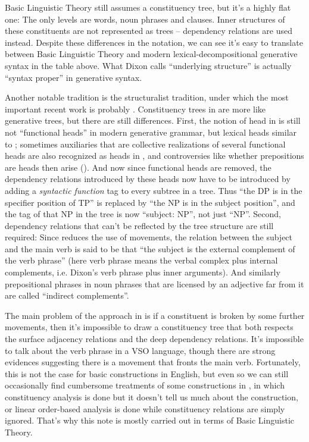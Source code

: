 \documentclass[UTF8, a4paper, oneside, scheme=plain]{ctexrep}
\begin{document}
Basic Linguistic Theory still assumes a constituency tree,
but it's a highly flat one:
The only levels are words, noun phrases and clauses.
Inner structures of these constituents are not represented as trees -- 
dependency relations are used instead.
Despite these differences in the notation, 
we can see it's easy to translate between Basic Linguistic Theory 
and modern lexical-decompositional generative syntax
in the table above.
What Dixon calls ``underlying structure'' is actually ``syntax proper'' in generative syntax.

Another notable tradition is the structuralist tradition,
under which the most important recent work is probably \citet{cgel}.
Constituency trees in \citet{cgel} are more like generative trees,
but there are still differences.
First, the notion of head in \citet{cgel} is still not ``functional heads'' 
in modern generative grammar, but lexical heads similar to \citet{dixon2009basic1};
sometimes auxiliaries that are collective realizations of several functional heads 
are also recognized as heads in \citet{cgel}, 
and controversies like whether prepositions are heads then arise
().
And now since functional heads are removed,
the dependency relations introduced by these heads
now have to be introduced by adding a \emph{syntactic function} tag 
to every subtree in a tree.
Thus ``the DP is in the specifier position of TP''
is replaced by ``the NP is in the subject position'',
and the tag of that NP in the tree is now ``subject: NP'',
not just ``NP''.
Second, dependency relations that can't be reflected by the tree structure are still required:
Since \citet{cgel} reduces the use of movements,
the relation between the subject and the main verb 
is said to be that ``the subject is the external complement of the verb phrase''
(here verb phrase means the verbal complex plus internal complements,
i.e. Dixon's verb phrase plus inner arguments).
And similarly prepositional phrases in noun phrases that are licensed by an adjective far from it 
are called ``indirect complements''.

The main problem of the approach in \citet{cgel} is 
if a constituent is broken by some further movements,
then it's impossible to draw a constituency tree that 
both respects the surface adjacency relations 
and the deep dependency relations.
It's impossible to talk about the verb phrase in a VSO language,
though there are strong evidences suggesting there is a movement that fronts the main verb.
Fortunately, this is not the case for basic constructions in English,
but even so we can still occasionally find cumbersome treatments of some constructions in \citet{cgel},
in which constituency analysis is done but it doesn't tell us much about the construction,
or linear order-based analysis is done while constituency relations are simply ignored.
That's why this note is mostly carried out in terms of Basic Linguistic Theory.
\end{document}

